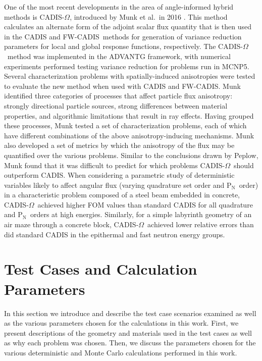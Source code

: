 \documentclass{article} %
\newcommand{\pn}{P$_\mathrm{N}$}
\newcommand{\fwc}{\mbox{FW-CADIS}}
\newcommand{\co}{\mbox{CADIS-$\Omega$}}
\begin{document}
One of the most recent developments in the area of angle-informed hybrid
methods is \co, introduced by Munk et al.\ in 2016 \cite{cadisom}. This method
calculates an alternate form of the adjoint scalar flux quantity that is then
used in the CADIS and \fwc\ methods for generation of variance reduction
parameters for local and global response functions, respectively. The \co\
method was implemented in the ADVANTG framework, with numerical experiments
performed testing variance reduction for problems run in MCNP5. Several
characterization problems with spatially-induced anisotropies were tested to
evaluate the new method when used with CADIS and \fwc. Munk identified three
categories of processes that affect particle flux  anisotropy: strongly
directional particle sources, strong differences between material properties,
and algorithmic limitations that result in ray effects. Having grouped these
processes, Munk tested a set of characterization problems, each of which have
different combinations of the above anisotropy-inducing mechanisms. Munk also
developed a set of metrics by which the anisotropy of the flux may be
quantified over the various problems. Similar to the conclusions drawn by
Peplow, Munk found that it was difficult to predict for which problems \co\
should outperform CADIS. When considering a parametric study of deterministic
variables likely to affect angular flux (varying quadrature set order and \pn\
order) in a characteristic problem composed of a steel beam embedded in
concrete, \co\ achieved higher FOM values than standard CADIS for all
quadrature and \pn\ orders at high energies. Similarly, for a simple labyrinth
geometry of an air maze through a concrete block, \co\ achieved lower relative
errors than did standard CADIS in the epithermal and fast neutron energy
groups.

\section{Test Cases and Calculation Parameters}

In this section we introduce and describe the test case scenarios examined as
well as the various parameters chosen for the calculations in this work.
First, we present descriptions of the geometry and materials used in the test
cases as well as why each problem was chosen. Then, we discuss the parameters
chosen for the various deterministic and Monte Carlo calculations performed in
this work.
\end{document}
